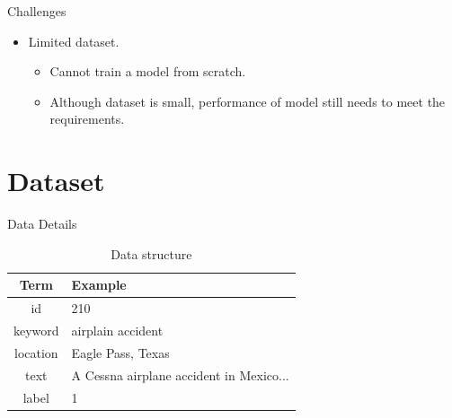 \documentclass[
 size=14pt,
 paper=smartboard,  %
 mode=present, 		%
 display=slides, 	%
 style=tuliplab,  	%
 pauseslide,
 fleqn,leqno]{powerdot}
\begin{document}
\begin{slide}[toc=,bm=]{Challenges}

\begin{itemize}
\item
Limited dataset.

\begin{itemize}
\item
Cannot train a model from scratch.

\item
Although dataset is small, performance of model still needs to meet the requirements.

\end{itemize}
\end{itemize}

\end{slide}



\section{Dataset}


\begin{slide}{Data Details}
\bigskip \bigskip \bigskip
\begin{table}[htbp]
	\setlength{\abovecaptionskip}{0pt}
	\setlength{\belowcaptionskip}{10pt}
	\centering
	\caption{Data structure}
	
	\begin{tabular}{cl}
		\hline
		Term                 & Example     \\
		\hline
		id     & 210                \\
		keyword          & airplain accident                         \\
		location         & Eagle Pass, Texas           \\
		text   & A Cessna airplane accident in Mexico...            \\
		label              & 1                   \\
		\hline
	\end{tabular}
\end{table}

\end{slide}
\end{document}
